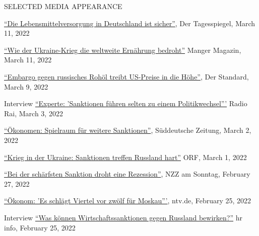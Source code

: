 \documentclass{article}
\begin{document}
\medskip

\begin{minipage}[t]{0.12\textwidth}
    {\selectfont SELECTED MEDIA \mbox APPEARANCE} \\
\end{minipage}
\hspace{5mm}
\begin{minipage}[t]{0.8\textwidth}
    \href{https://www.tagesspiegel.de/wirtschaft/agrarminister-cem-oezdemir-zu-den-folgen-des-kriegs-die-lebensmittelversorgung-in-deutschland-ist-sicher/28155160.html}{``Die Lebensmittelversorgung in Deutschland ist sicher''}, Der Tagesspiegel, March 11, 2022 \par
    \href{https://www.manager-magazin.de/politik/wie-es-um-die-ernaehrungssicherheit-steht-ausfall-der-ukraine-als-getreide-exporteur-trifft-afrika-hart-a-fdf304e9-e490-4d78-8cf1-f56464958af1}{``Wie der Ukraine-Krieg die weltweite Ernährung bedroht''} Manger Magazin, March 11, 2022 \par
    \href{https://www.derstandard.at/story/2000133979024/embargo-gegen-russisches-rohoel-treibt-us-preise-in-die-hoehe}{``Embargo gegen russisches Rohöl treibt US-Preise in die Höhe''}, Der Standard, March 9, 2022 \par
    Interview \href{https://www.rainews.it/tgr/tagesschau/audio/2022/03/tag-Hendrik-Mahlkow-Institut-fuer-Weltwirtschaft-Kiel-Sanktionen-Russland-Ukrainekrieg-4be0c70d-61c5-4749-9088-689b3ee625f2.html}{``Experte: 'Sanktionen führen selten zu einem Politikwechsel'''} Radio Rai, March 3, 2022 \par
    \href{https://www.sueddeutsche.de/wirtschaft/strafmassnahmen-oekonomen-spielraum-fuer-weitere-sanktionen-1.5538934}{``Ökonomen: Spielraum für weitere Sanktionen''}, Süddeutsche Zeitung, March 2, 2022 \par
    \href{https://orf.at/stories/3250156/}{``Krieg in der Ukraine: Sanktionen treffen Russland hart''} ORF, March 1, 2022 \par
    \href{https://magazin.nzz.ch/nzz-am-sonntag/international/bei-der-schaerfsten-sanktion-droht-eine-rezession-ld.1671972?reduced=true}{``Bei der schärfsten Sanktion droht eine Rezession''}, NZZ am Sonntag, February 27, 2022 \par
    \href{https://www.n-tv.de/wirtschaft/Okonom-Es-schlaegt-Viertel-vor-zwoelf-fuer-Moskau-article23155253.html}{``Ökonom: 'Es schlägt Viertel vor zwölf für Moskau'''}, ntv.de, February 25, 2022 \par
    Interview \href{https://www.hr-inforadio.de/programm/themen/ukraine-krieg-was-koennen-wirtschaftssanktionen-gegen-russland-bewirken,ukraine-konflikt-was-koennen-sanktionen-bewirken-100.html}{``Was können Wirtschaftssanktionen gegen Russland bewirken?''} hr info, February 25, 2022 \par

\end{minipage}
\end{document}
